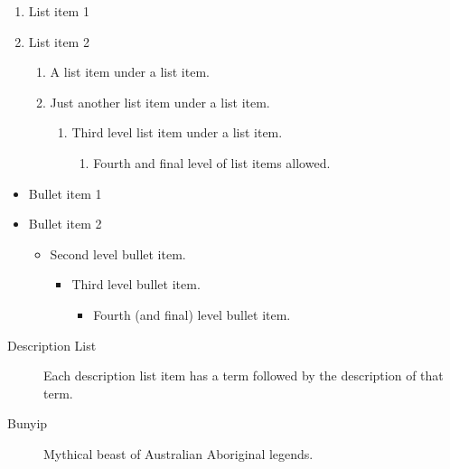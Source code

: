 \documentclass{book}\usepackage{knitr}
\begin{document}
\begin{enumerate}
\item List item 1

\item List item 2

\begin{enumerate}
\item A list item under a list item.

\item Just another list item under a list item.

\begin{enumerate}
\item Third level list item under a list item.

\begin{enumerate}
\item Fourth and final level of list items allowed.
\end{enumerate}
\end{enumerate}
\end{enumerate}
\end{enumerate}

\begin{itemize}
\item Bullet item 1

\item Bullet item 2

\begin{itemize}
\item Second level bullet item.

\begin{itemize}
\item Third level bullet item.

\begin{itemize}
\item Fourth (and final) level bullet item.
\end{itemize}
\end{itemize}
\end{itemize}
\end{itemize}

\begin{description}
\item[Description List] Each description list item has a term followed by the
description of that term.

\item[Bunyip] Mythical beast of Australian Aboriginal legends.
\end{description}
\end{document}
